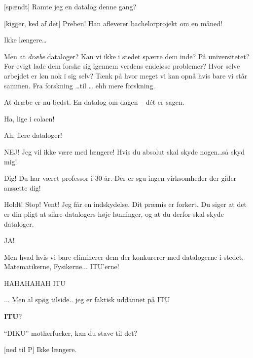\documentclass[a4paper,11pt]{article}
\begin{document}
\begin{sketch}

[spændt] Ramte jeg en datalog denne gang?

[kigger, ked af det] Preben!  Han afleverer bachelorprojekt om en måned!

  Ikke længere\ldots


 Men at \emph{dræbe} dataloger?  Kan vi ikke i stedet spærre dem inde?
På universitetet?  For evigt lade dem forske sig igennem verdens endeløse
problemer?  Hvor selve arbejdet er løn nok i sig selv?  Tænk på hvor meget vi
kan opnå hvis bare vi står sammen.  Fra forskning \ldots til \ldots
ehh mere forskning. 


  At dræbe er nu bedst.   En datalog om dagen -- dét er sagen.


 Ha, lige i colaen!


  Ah, flere dataloger!

 NEJ!  Jeg vil ikke være med længere!  Hvis du
absolut skal skyde nogen\ldots så skyd mig!

 Dig!  Du har været professor i 30 år.  Der er sgu
ingen virksomheder der gider ansætte dig!


 Holdt!  Stop!  Vent!  Jeg får en indskydelse.  Dit præmis er forkert.
Du siger at det er din pligt at sikre datalogers høje lønninger, og at du derfor
skal skyde dataloger.

 JA!

 Men hvad hvis vi bare eliminerer dem der konkurerer med datalogerne i stedet,
Matematikerne, Fysikerne... ITU'erne!

 HAHAHAHAH ITU

 ... Men al spøg tilside.. jeg er faktisk uddannet på ITU

 \textbf{ITU}?


 ``DIKU'' motherfucker, kan du stave til det?


[ned til P] Ikke længere.



\end{sketch}
\end{document}

